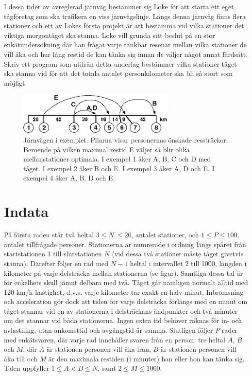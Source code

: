 
I dessa tider av avreglerad järnväg bestämmer sig Loke för att starta ett eget tågföretag som ska trafikera en viss järnvägslinje. Längs denna järnväg finns flera stationer och ett av Lokes första projekt är att bestämma vid vilka stationer det viktiga morgontåget ska stanna. Loke vill grunda sitt beslut på en stor enkätundersökning där han frågat varje tänkbar resenär mellan vilka stationer de vill åka och hur lång restid de kan tänka sig innan de väljer något annat färdsätt. Skriv ett program som utifrån detta underlag bestämmer vilka stationer tåget ska stanna vid för att det totala antalet personkilometer ska bli så stort som möjligt.

\begin{figure}[!h]
\begin{center}
\includegraphics[width=0.7\textwidth]{jarnvagen.png}
\end{center}
\caption{Järnvägen i exemplet. Pilarna visar personernas önskade ressträckor. Beroende på vilken maximal restid E väljer så blir olika mellanstationer optimala. I exempel 1 åker A, B, C och D med tåget. I exempel 2 åker B och E. I exempel 3 åker A, D och E. I exempel 4 åker A, B, D och E.}
\label{fig1}
\end{figure}

\section*{Indata}

På första raden står två heltal $3\le N\ \le 20$, antalet stationer, och $1 \le P \le 100$, antalet tillfrågade personer. Stationerna är numrerade i ordning längs spåret från startstationen 1 till slutstationen $N$ (vid dessa två stationer måste tåget givetvis stanna). Därefter följer en rad med $N-1$ heltal i intervallet 2 till 1000, längden i kilometer på varje delsträcka mellan stationerna (se figur). Samtliga dessa tal är för enkelhets skull jämnt delbara med två. Tåget går nämligen normalt alltid med 120 km/h hastighet, d.v.s. varje kilometer tar exakt en halv minut. Inbromsning och acceleration gör dock att tiden för varje delsträcka förlängs med en minut om tåget stannar vid en av stationerna i delsträckans ändpunkter och två minuter om det stannar vid båda stationerna. Ingen extra tid behöver räknas för in- och avlastning, utan ankomsttid och avgångstid är samma. Slutligen följer $P$ rader med enkätsvaren, där varje rad innehåller svaren från en person: tre heltal $A$, $B$ och $M$, där $A$ är stationen personen vill åka från, $B$ är stationen personen vill åka till och $M$ är den maximala restiden (i minuter) han eller hon kan tänka sig. Talen uppfyller $1\le A < B \le N$, samt $2\le M\le 1000$.

